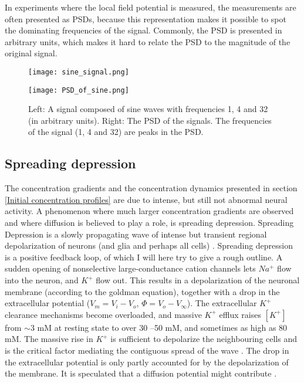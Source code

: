 \documentclass{article}
\begin{document}
In experiments where the local field potential is measured, the measurements are often presented as PSDs, because this representation makes it possible to spot the dominating frequencies of the signal. Commonly, the PSD is presented in arbitrary units, which makes it hard to relate the PSD to the magnitude of the original signal.

\begin{figure}[!tbp]
  \centering
  \begin{minipage}[b]{0.45\textwidth}
    \texttt{[image: sine\_signal.png]}
  \end{minipage}
  \begin{minipage}[b]{0.45\textwidth}
    \texttt{[image: PSD\_of\_sine.png]}
  \end{minipage}  
   \caption{Left: A signal composed of sine waves with frequencies 1, 4 and 32 (in arbitrary units).  Right: The PSD of the signals. The frequencies of the signal (1, 4 and 32) are peaks in the PSD. }
  \label{fig:PSD_of_sine}
\end{figure}

\subsection{Spreading depression}\label{SD}
The concentration gradients and the concentration dynamics presented in section \ref{Initial concentration profiles} are due to intense, but still not abnormal neural activity. A phenomenon where much larger concentration gradients are observed and where diffusion is believed to play a role, is spreading depression. Spreading Depression is a slowly propagating wave of intense but transient
regional depolarization of neurons (and glia and perhaps all cells) \cite{Ataya2015}. Spreading depression is a positive feedback loop, of which I will here try to give a rough outline. A sudden opening of nonselective large-conductance cation channels lets $Na^+$ flow into the neuron, and $K^+$ flow out. This results in a depolarization of the neuronal membrane (according to the goldman equation), together with a drop in the extracellular potential ($V_m=V_i-V_o$, $\Phi = V_o - V_{\infty}$). The extracellular $K^+$ clearance mechanisms become overloaded, and massive $K^+$ efflux raises $[K^+]$ from $ \sim 3$ mM at resting state
to over 30 –50 mM, and sometimes as
high as 80 mM. The massive rise in $K^+$ is sufficient to depolarize the neighbouring cells and is the critical factor mediating the contiguous spread of
the wave \cite{Ataya2015}. The drop in the extracellular potential is only partly accounted for by the depolarization of the membrane. It is speculated that a diffusion potential might contribute \cite{Herreras1993}. 
\end{document}
